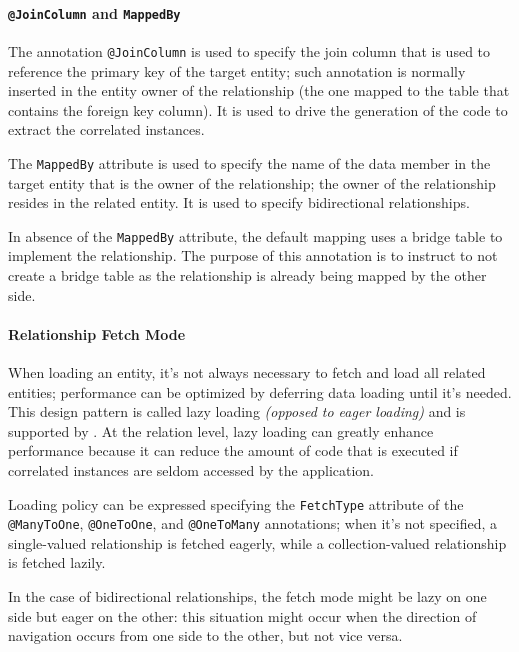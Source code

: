 \documentclass[english]{article}
\begin{document}
\paragraph{\texttt{@JoinColumn} and \texttt{MappedBy}}

The annotation \texttt{@JoinColumn} is used to specify the join column that is used to reference the primary key of the target entity; such annotation is normally inserted in the entity owner of the relationship (the one mapped to the table that contains the foreign key column).
It is used to drive the generation of the \sql code to extract the correlated instances.

The \texttt{MappedBy} attribute is used to specify the name of the data member in the target entity that is the owner of the relationship; the owner of the relationship resides in the related entity.
It is used to specify bidirectional relationships.

In absence of the \texttt{MappedBy} attribute, the default \jpa mapping uses a bridge table to implement the relationship.
The purpose of this annotation is to instruct \jpa to not create a bridge table as the relationship is already being mapped by the other side.

\paragraph{Relationship Fetch Mode}

When loading an entity, it's not always necessary to fetch and load all related entities;
performance can be optimized by deferring data loading until it's needed.
This design pattern is called lazy loading \textit{(opposed to eager loading)} and is supported by \jpa.
At the relation level, lazy loading can greatly enhance performance because it can reduce the amount of \sql code that is executed if correlated instances are seldom accessed by the application.

Loading policy can be expressed specifying the \texttt{FetchType} attribute of the \texttt{@ManyToOne}, \texttt{@OneToOne}, and \texttt{@OneToMany} annotations;
when it's not specified, a single-valued relationship is fetched eagerly, while a collection-valued relationship is fetched lazily.

In the case of bidirectional relationships, the fetch mode might be lazy on one side but eager on the other: this situation might occur when the direction of navigation occurs from one side to the other, but not vice versa.
\end{document}
